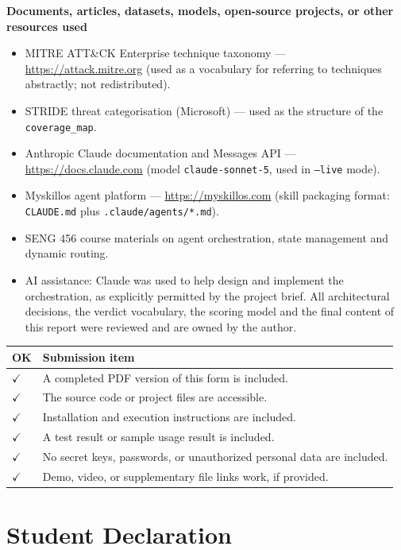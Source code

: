 \documentclass[11pt,a4paper]{article}
\newcommand{\qa}[2]{\textbf{#1}\par\vspace{-2pt}\begin{answerbox}#2\end{answerbox}}
\newcommand{\yes}{$\checkmark$}
\begin{document}
\qa{Documents, articles, datasets, models, open-source projects, or other resources used}{%
\begin{itemize}[nosep]
  \item MITRE ATT\&CK Enterprise technique taxonomy --- \url{https://attack.mitre.org}
        (used as a vocabulary for referring to techniques abstractly; not redistributed).
  \item STRIDE threat categorisation (Microsoft) --- used as the structure of the
        \texttt{coverage\_map}.
  \item Anthropic Claude documentation and Messages API --- \url{https://docs.claude.com}
        (model \texttt{claude-sonnet-5}, used in \texttt{--live} mode).
  \item Myskillos agent platform --- \url{https://myskillos.com} (skill packaging format:
        \texttt{CLAUDE.md} plus \texttt{.claude/agents/*.md}).
  \item SENG 456 course materials on agent orchestration, state management and dynamic
        routing.
  \item AI assistance: Claude was used to help design and implement the orchestration, as
        explicitly permitted by the project brief. All architectural decisions, the
        verdict vocabulary, the scoring model and the final content of this report were
        reviewed and are owned by the author.
\end{itemize}}

\begin{tabularx}{\linewidth}{@{}C{1.0cm}Y@{}}
\toprule
\textbf{OK} & \textbf{Submission item} \\
\midrule
\yes & A completed PDF version of this form is included. \\
\yes & The source code or project files are accessible. \\
\yes & Installation and execution instructions are included. \\
\yes & A test result or sample usage result is included. \\
\yes & No secret keys, passwords, or unauthorized personal data are included. \\
\yes & Demo, video, or supplementary file links work, if provided. \\
\bottomrule
\end{tabularx}

\section{Student Declaration}
\end{document}
